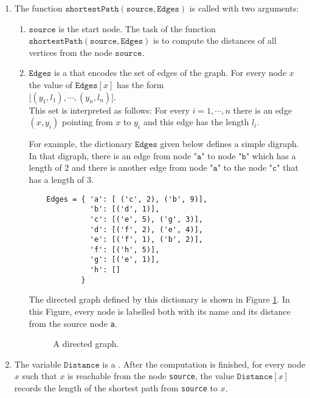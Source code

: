 \noindent
\begin{enumerate}
\item The function $\texttt{shortestPath}(\texttt{source}, \texttt{Edges})$ is called with two arguments:
      \begin{enumerate}
      \item $\texttt{source}$ is the start node.  The task of the function
            $\texttt{shortestPath}(\texttt{source}, \texttt{Edges})$ is to compute the distances of all 
            vertices from the node $\texttt{source}$.
      \item $\texttt{Edges}$ is a  that encodes the set of edges of the graph.  For
            every node $x$ the value of $\texttt{Edges}[x]$ has the form
            \\[0.2cm]
            \hspace*{1.3cm}
            $\bigl[ (y_1, l_1), \cdots, (y_n, l_n) \bigr]$.
            \\[0.2cm]
            This set is interpreted as follows: For every $i = 1,\cdots,n$ there is an edge
            $(x, y_i)$ pointing from $x$ to $y_i$ and this edge has the length $l_i$.

            For example, the dictionary $\texttt{Edges}$ given below defines a simple digraph.
            In that digraph, there is an edge from node $\texttt{"a"}$ to node $\texttt{"b"}$ which has a
            length of $2$ and there is another edge from node $\texttt{"a"}$ to the node $\texttt{"c"}$ that has a length of $3$.
            \begin{verbatim}
    Edges = { 'a': [ ('c', 2), ('b', 9)], 
              'b': [('d', 1)],
              'c': [('e', 5), ('g', 3)],  
              'd': [('f', 2), ('e', 4)],  
              'e': [('f', 1), ('b', 2)],
              'f': [('h', 5)],
              'g': [('e', 1)],
              'h': []
            }
            \end{verbatim}
      
      The directed graph defined by this dictionary is shown in Figure \ref{fig:directed-graph.pdf}.
      In this Figure, every node is labelled both with its name and its distance from the source node \texttt{a}.
      \begin{figure}[!ht]
        \centering
        \caption{A directed graph.}
        \label{fig:directed-graph.pdf}
      \end{figure}
      \end{enumerate}
\item The variable $\texttt{Distance}$ is a .  After the computation is
      finished, for every node $x$ such that $x$ is reachable from the node \texttt{source},
      the value $\texttt{Distance}[x]$ records the length of the shortest path from \texttt{source} to $x$.


\end{enumerate}
